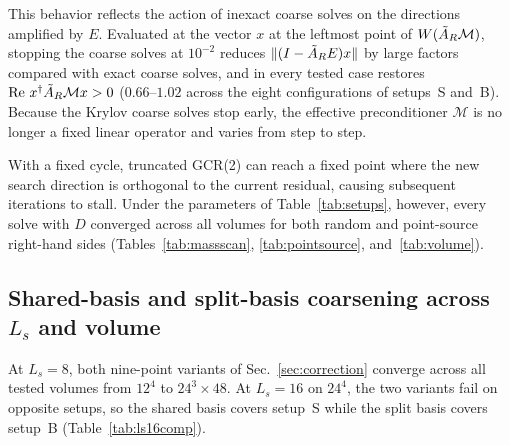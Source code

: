 This behavior reflects the action of inexact coarse solves on the directions amplified by $E$.
Evaluated at the vector $x$ at the leftmost point of $W(\tilde A_{R}\mathcal M)$, stopping the coarse solves
at $10^{-2}$ reduces $\|(I-\tilde A_{R} E)x\|$ by large factors compared with exact coarse solves, and in
every tested case restores $\operatorname{Re}\,x^{\dagger}\tilde A_{R}\mathcal Mx>0$ ($0.66$--$1.02$ across the eight
configurations of setups~S and~B). Because the Krylov coarse solves stop early, the
effective preconditioner $\mathcal M$ is no longer a fixed linear operator and varies from step to
step.

With a fixed cycle, truncated GCR(2) can reach a fixed point where the new search direction is
orthogonal to the current residual, causing subsequent iterations to stall. Under the parameters of
Table~\ref{tab:setups}, however, \New every solve with $D$ converged across all
volumes for both random and point-source right-hand sides (Tables~\ref{tab:massscan},
\ref{tab:pointsource}, and~\ref{tab:volume}).

\subsection{\New Shared-basis and split-basis coarsening across $L_s$ and volume}
\label{sec:ls16comp}

At $L_s=8$, both nine-point variants of Sec.~\ref{sec:correction} converge across all tested
volumes from $12^4$ to $24^3\times48$. At $L_s=16$ on $24^4$, the two variants fail on opposite
setups, so the shared basis covers setup~S while the split basis covers setup~B
(Table~\ref{tab:ls16comp}).

